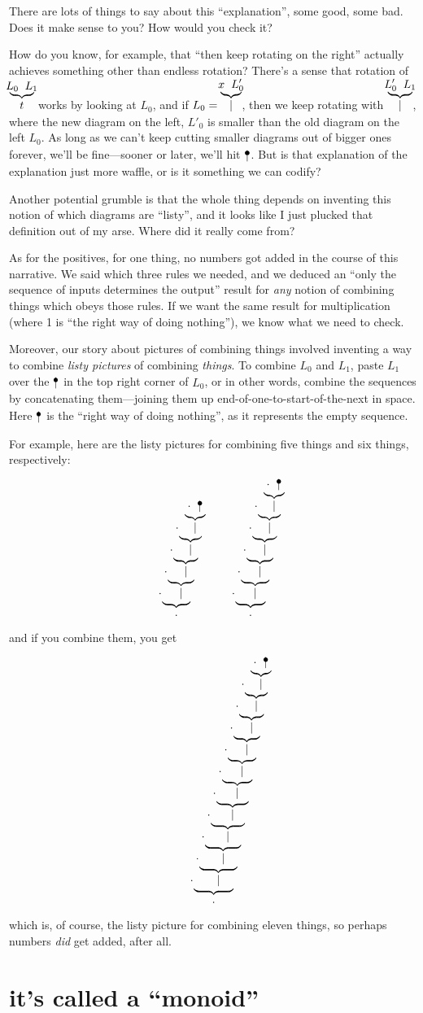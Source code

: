 \documentclass{book}
\begin{document}
There are lots of things to say about this ``explanation'', some good, some bad. Does it make sense to you? How would you check it?

How do you know, for example, that ``then keep rotating on the right'' actually achieves something other than endless rotation? There's a sense that rotation of $\wye{L_0}{L_1}t$ works by looking at $L_0$, and if $L_0 = \wye x{L'_0}\mid$, then we keep rotating with $\wye{L'_0}{L_1}\mid$, where the new diagram on the left, $L'_0$ is smaller than the old diagram on the left $L_0$. As long as we can't keep cutting smaller diagrams out of bigger ones forever, we'll be fine---sooner or later, we'll hit $\naw{}$. But is that explanation of the explanation just more waffle, or is it something we can codify?

Another potential grumble is that the whole thing depends on inventing this notion of which diagrams are ``listy'', and it looks like I just plucked that definition out of my arse. Where did it really come from?

As for the positives, for one thing, no numbers got added in the course of this narrative. We said which three rules we needed, and we deduced an ``only the sequence of inputs determines the output'' result for \emph{any} notion of combining things which obeys those rules. If we want the same result for multiplication (where 1 is ``the right way of doing nothing''), we know what we need to check.

Moreover, our story about pictures of combining things involved inventing a way to combine \emph{listy pictures} of combining \emph{things}. To combine $L_0$ and $L_1$, paste $L_1$ over the $\naw{}$ in the top right corner of $L_0$, or in other words, combine the sequences by concatenating them---joining them up end-of-one-to-start-of-the-next in space. Here $\naw{}$ is the ``right way of doing nothing'', as it represents the empty sequence. 

For example, here are the listy pictures for combining five things and six things, respectively:
\newcommand{\mo}[1]{\wye{\cdot}{#1}{\mid}}
\[
\wye{\cdot}{\mo{\mo{\mo{\mo{\naw{}}}}}}{\cdot}
\qquad\qquad
\wye{\cdot}{\mo{\mo{\mo{\mo{\mo{\naw{}}}}}}}{\cdot}
\]
and if you combine them, you get
\[
\wye{\cdot}{\mo{\mo{\mo{\mo{\mo{\mo{\mo{\mo{\mo{\mo{\naw{}}}}}}}}}}}}{\cdot}
\]
which is, of course, the listy picture for combining eleven things, so perhaps numbers \emph{did} get added, after all.


\section{it's called a ``monoid''}
\end{document}
